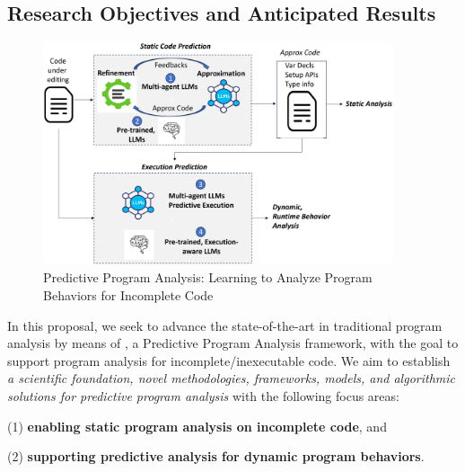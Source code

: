 \subsection{Research Objectives and Anticipated Results}

\begin{figure}[t]
    \centering
    \includegraphics[width=0.92\textwidth]{overview.png}
    \vspace{-10pt}
    \caption{Predictive Program Analysis: Learning to Analyze Program Behaviors for Incomplete Code}
    \label{fig:arch}
\end{figure}


In this proposal, we seek to advance the state-of-the-art in
traditional program analysis by means of {\tool}, a Predictive Program
Analysis framework, with the goal to support program analysis for
incomplete/inexecutable code. We aim to establish {\em a scientific
  foundation, novel methodologies, frameworks, models, and algorithmic
  solutions for predictive program analysis} with the following focus
areas:



(1) {\bf enabling static program analysis on incomplete code}, and

(2) {\bf supporting predictive analysis for dynamic program behaviors}.



